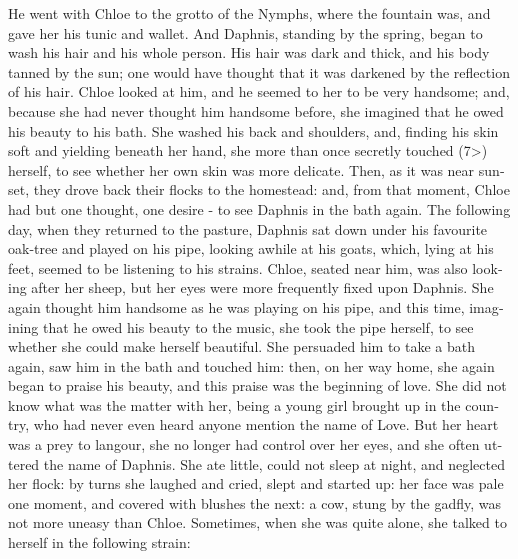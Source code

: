 \documentclass{book}
\begin{document}
\begin{pairs}
\begin{Rightside}
\begin{english}
  He went with Chloe to the grotto of the Nymphs, where the fountain was, and gave her his tunic and wallet.  And Daphnis, standing by the spring, began to wash his hair and his whole person.  His hair was dark and thick, and his body tanned by the sun; one would have thought that it was darkened by the reflection of his hair.  Chloe looked at him, and he seemed to her to be very handsome; and, because she had never thought him handsome before, she imagined that he owed his beauty to his bath.  She washed his back and shoulders, and, finding his skin soft and yielding beneath her hand, she more than once secretly touched (7>) herself, to see whether her own skin was more delicate.  Then, as it was near sunset, they drove back their flocks to the homestead: and, from that moment, Chloe had but one thought, one desire - to see Daphnis in the bath again.  The following day, when they returned to the pasture, Daphnis sat down under his favourite oak-tree and played on his pipe, looking awhile at his goats, which, lying at his feet, seemed to be listening to his strains. Chloe, seated near him, was also looking after her sheep, but her eyes were more frequently fixed upon Daphnis.  She again thought him handsome as he was playing on his pipe, and this time, imagining that he owed his beauty to the music, she took the pipe herself, to see whether she could make herself beautiful.  She persuaded him to take a bath again, saw him in the bath and touched him: then, on her way home, she again began to praise his beauty, and this praise was the beginning of love.  She did not know what was the matter with her, being a young girl brought up in the country, who had never even heard anyone mention the name of Love.  But her heart was a prey to langour, she no longer had control over her eyes, and she often uttered the name of Daphnis.  She ate little, could not sleep at night, and neglected her flock: by turns she laughed and cried, slept and started up: her face was pale one moment, and covered with blushes the next: a cow, stung by the gadfly, was not more uneasy than Chloe.  Sometimes, when she was quite alone, she talked to herself in the following strain:
\pend



\end{english}
\end{Rightside}
\end{pairs}
\end{document}
